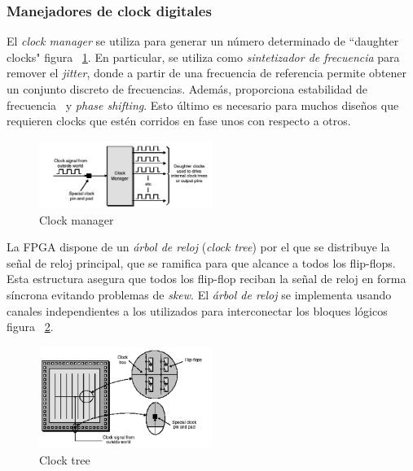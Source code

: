 \subsubsection{Manejadores de clock digitales}

El \textit{clock manager} se utiliza para generar un número
determinado de “daughter clocks" figura ~\ref{fig:dclocks}. En
particular, se utiliza como \textit{sintetizador de frecuencia} para
remover el \textit{jitter}, donde a partir de una frecuencia de
referencia permite obtener un conjunto discreto de frecuencias. Además, proporciona estabilidad de frecuencia~\cite{Etiqueta03} y
\textit{phase shifting}. Esto último es necesario para muchos diseños que
requieren clocks que estén corridos en fase unos con respecto a otros.

\begin{figure}[h!]
\begin{center}
\includegraphics[width=0.5\textwidth,keepaspectratio=true]{./images/dougther}
\caption{Clock manager}
\label{fig:dclocks}
\end{center}
\end{figure}

La FPGA dispone de un \textit{árbol de reloj} (\textit{clock tree})
por el que se distribuye la señal de reloj principal, que se
ramifica para que alcance a todos los flip-flops. Esta estructura
asegura que todos los flip-flop reciban la señal de reloj en forma
síncrona evitando problemas de \textit{skew}. El \textit{árbol de
  reloj} se implementa usando canales independientes a los
utilizados para interconectar los bloques lógicos figura
~\ref{fig:ctree}.

\begin{figure}[h!]
\begin{center}
\includegraphics[width=0.5\textwidth,keepaspectratio=true]{./images/clocktree}
\caption{Clock tree}
\label{fig:ctree}
\end{center}
\end{figure}

